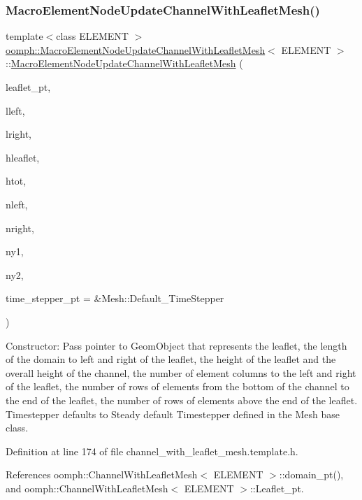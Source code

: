\subsubsection{\texorpdfstring{Macro\+Element\+Node\+Update\+Channel\+With\+Leaflet\+Mesh()}{MacroElementNodeUpdateChannelWithLeafletMesh()}}
{\footnotesize\ttfamily template$<$class E\+L\+E\+M\+E\+NT $>$ \\
\hyperlink{classoomph_1_1MacroElementNodeUpdateChannelWithLeafletMesh}{oomph\+::\+Macro\+Element\+Node\+Update\+Channel\+With\+Leaflet\+Mesh}$<$ E\+L\+E\+M\+E\+NT $>$\+::\hyperlink{classoomph_1_1MacroElementNodeUpdateChannelWithLeafletMesh}{Macro\+Element\+Node\+Update\+Channel\+With\+Leaflet\+Mesh} (\begin{DoxyParamCaption}\item[{Geom\+Object $\ast$}]{leaflet\+\_\+pt,  }\item[{const double \&}]{lleft,  }\item[{const double \&}]{lright,  }\item[{const double \&}]{hleaflet,  }\item[{const double \&}]{htot,  }\item[{const unsigned \&}]{nleft,  }\item[{const unsigned \&}]{nright,  }\item[{const unsigned \&}]{ny1,  }\item[{const unsigned \&}]{ny2,  }\item[{Time\+Stepper $\ast$}]{time\+\_\+stepper\+\_\+pt = {\ttfamily \&Mesh\+:\+:Default\+\_\+TimeStepper} }\end{DoxyParamCaption})\hspace{0.3cm}{\ttfamily [inline]}}



Constructor\+: Pass pointer to Geom\+Object that represents the leaflet, the length of the domain to left and right of the leaflet, the height of the leaflet and the overall height of the channel, the number of element columns to the left and right of the leaflet, the number of rows of elements from the bottom of the channel to the end of the leaflet, the number of rows of elements above the end of the leaflet. Timestepper defaults to Steady default Timestepper defined in the Mesh base class. 



Definition at line 174 of file channel\+\_\+with\+\_\+leaflet\+\_\+mesh.\+template.\+h.



References oomph\+::\+Channel\+With\+Leaflet\+Mesh$<$ E\+L\+E\+M\+E\+N\+T $>$\+::domain\+\_\+pt(), and oomph\+::\+Channel\+With\+Leaflet\+Mesh$<$ E\+L\+E\+M\+E\+N\+T $>$\+::\+Leaflet\+\_\+pt.

